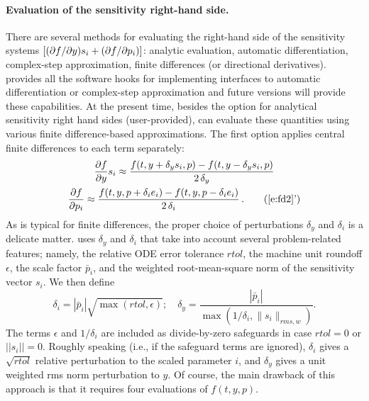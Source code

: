 \paragraph{Evaluation of the sensitivity right-hand side.}
There are several methods for evaluating the right-hand side of the sensitivity 
systems $\left[ (\partial f / \partial y) s_i + (\partial f / \partial p_i) \right]$: 
analytic evaluation, automatic differentiation, complex-step approximation, 
finite differences (or directional derivatives).
{\cvodes} provides all the software hooks for implementing interfaces to
automatic differentiation or complex-step approximation and future versions
will provide these capabilities.
At the present time, besides the option for analytical sensitivity right hand sides
(user-provided), {\cvodes} can evaluate these quantities using various
finite difference-based approximations.
The first option applies central finite differences to each term separately:
\begin{gather}
\dfdy s_i \approx 
\frac{f(t, y+\delta_y s_i, p)-
f(t, y-\delta_y s_i, p)}{2\,\delta_y} \label{e:fd2}\\
\dfdpi \approx 
\frac{f(t,y,p + \delta_i e_i)-
f(t,y,p - \delta_i e_i)}{2\,\delta_i} \, .\tag{\ref{e:fd2}'}
\end{gather}
As is typical for finite differences, the proper choice of
perturbations $\delta_y$ and $\delta_i$ is a delicate matter.
{\cvodes} uses $\delta_y$ and $\delta_i$ that take into account
several problem-related features;
namely, the relative ODE error tolerance $rtol$, the machine unit roundoff $\epsilon$,
the scale factor ${\bar p}_i$, and the weighted root-mean-square norm of the 
sensitivity vector $s_i$.
We then define
\begin{equation*}
\delta_i = |{\bar p}_i| \sqrt{\max(rtol, \epsilon)};
\quad
\delta_y = \frac{|{\bar p}_i|}{\max(1/\delta_i, \|s_i\|_{rms,w})}.
\end{equation*}
The terms $\epsilon$ and $1/\delta_i$ are included as
divide-by-zero safeguards in case $rtol = 0$ or $||s_i|| = 0$.
Roughly speaking (i.e., if the safeguard terms are ignored),
$\delta_i$ gives a $\sqrt{rtol}$ relative perturbation to the scaled parameter
$i$, and $\delta_y$ gives a unit weighted rms norm perturbation to $y$.
Of course, the main drawback of this approach is that it requires four
evaluations of $f(t,y,p)$.

